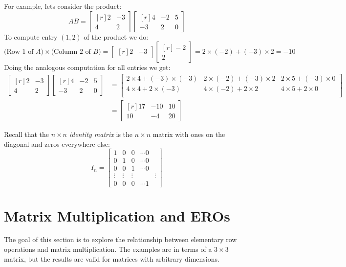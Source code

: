 \documentclass[12pt]{article}
\begin{document}
For example, lets consider the product:
\[
AB=
\begin{bmatrix*}[r]2&-3\\4&2\end{bmatrix*}
\begin{bmatrix*}[r]4&-2&5\\-3&2&0\end{bmatrix*}
\]
To compute entry $(1,2)$ of the product we do:
\[
\text{(Row 1 of $A$)}\times\text{(Column 2 of $B$)}=
\begin{bmatrix*}[r]2&-3\end{bmatrix*}
\begin{bmatrix*}[r]-2\\2\end{bmatrix*}
=2\times(-2)+(-3)\times2=-10
\]
Doing the analogous computation for all entries we get:
\begin{align*}
\begin{bmatrix*}[r]2&-3\\4&2\end{bmatrix*}
\begin{bmatrix*}[r]4&-2&5\\-3&2&0\end{bmatrix*}&=
\begin{bmatrix}
2\times4 + (-3)\times(-3) & 2\times(-2) + (-3)\times2 & 2\times5 + (-3)\times 0 \\
4\times4 + 2\times(-3) & 4\times(-2) + 2\times2 & 4\times5 + 2\times0 \\
\end{bmatrix}\\
&=
\begin{bmatrix*}[r]
17 & -10 & 10\\
10 & -4  & 20
\end{bmatrix*}
\end{align*}

Recall that the $n\times n$ \emph{identity matrix} is the $n\times n$ matrix with ones on the diagonal and zeros everywhere else:
\[
I_n=
\begin{bmatrix}
1&0&0&\cdots0\\
0&1&0&\cdots0\\
0&0&1&\cdots0\\
\vdots&\vdots&\vdots&&\vdots\\
0&0&0&\cdots1
\end{bmatrix}
\]

\section{Matrix Multiplication and EROs}
The goal of this section is to explore the relationship between elementary row operations and matrix multiplication. The examples are in terms of a $3\times3$ matrix, but the results are valid for matrices with arbitrary dimensions.
\end{document}
